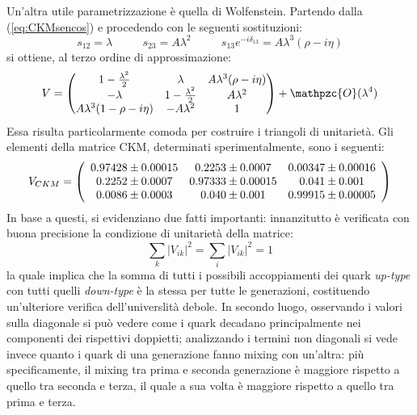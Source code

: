 \documentclass{subnucbo}
\begin{document}
Un'altra utile parametrizzazione è quella di Wolfenstein. Partendo dalla (\ref{eq:CKMsencos}) e procedendo con le seguenti sostituzioni:
\begin{equation}
        s_{12}=\lambda\,\,\,\,\,\,\,\,\,\,\,\,\,\,\,\,s_{23}=A\lambda^2\,\,\,\,\,\,\,\,\,\,\,\,\,\,\,\,s_{13}e^{-i\delta_{13}}=A\lambda^3(\rho-i\eta)
        \label{eq:parametriWolfenstein}
\end{equation}
si ottiene, al terzo ordine di approssimazione:
\begin{equation}
        V=
        \begin{pmatrix}
                1-\frac{\lambda^2}{2} & \lambda & A\lambda^3(\rho-i\eta)\\
                -\lambda & 1-\frac{\lambda^2}{2} & A\lambda^2\\
                A\lambda^3(1-\rho-i\eta) & -A\lambda^2 & 1
        \end{pmatrix}
        +\mathpzc{O}(\lambda^4)
        \label{eq:CKMWolfenstein}
\end{equation}
Essa risulta particolarmente comoda per costruire i triangoli di unitarietà.
Gli elementi della matrice CKM, determinati sperimentalmente, sono i seguenti:
\begin{equation}
        V _ { C K M } = \left( \begin{array} { c c c } { 0.97428 \pm 0.00015 } & { 0.2253 \pm 0.0007 } & { 0.00347 \pm 0.00016 } \\ { 0.2252 \pm 0.0007 } & { 0.97333 \pm 0.00015 } & { 0.041 \pm 0.001 } \\ { 0.0086 \pm 0.0003 } & { 0.040 \pm 0.001 } & { 0.99915 \pm 0.00005 } \end{array} \right)
        \label{eq:ckm_values}
\end{equation}
In base a questi, si evidenziano due fatti importanti: innanzitutto è verificata con buona precisione la condizione di unitarietà della matrice:
\begin{equation}
        \sum _ { k } \left| V _ { i k } \right| ^ { 2 } = \sum _ { i } \left| V _ { i k } \right| ^ { 2 } = 1
        \label{eq:weak_universality_ckm}
\end{equation}
la quale implica che la somma di tutti i possibili accoppiamenti dei quark \textit{up-type} con tutti quelli \textit{down-type} è la stessa per tutte le generazioni, costituendo un'ulteriore verifica dell'universlità debole. In secondo luogo, osservando i valori sulla diagonale si può vedere come i quark decadano principalmente nei componenti dei rispettivi doppietti; analizzando i termini non diagonali si vede invece quanto i quark di una generazione fanno mixing con un'altra: più specificamente, il mixing tra prima e seconda generazione è maggiore rispetto a quello tra seconda e terza, il quale a sua volta è maggiore rispetto a quello tra prima e terza.
\end{document}
